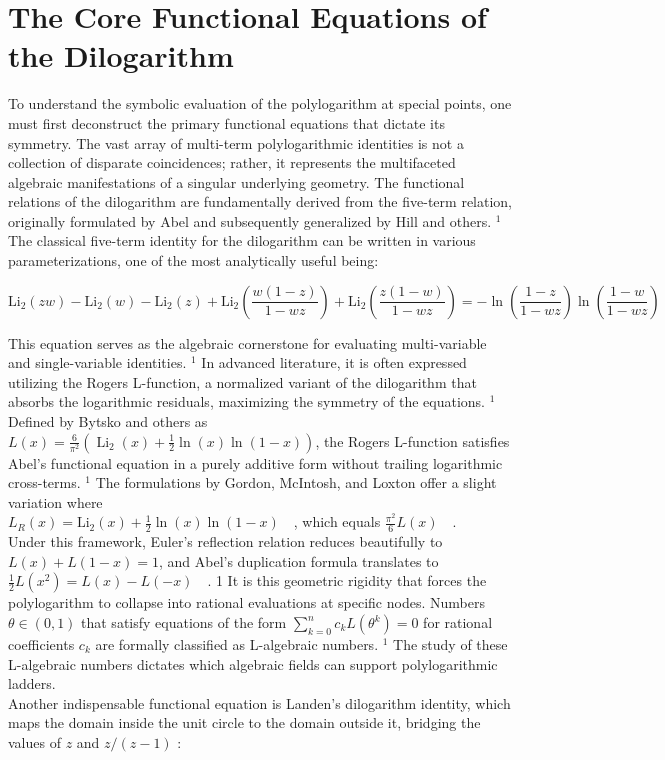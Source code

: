\documentclass[10pt]{article}
\begin{document}
\section*{The Core Functional Equations of the Dilogarithm}
To understand the symbolic evaluation of the polylogarithm at special points, one must first deconstruct the primary functional equations that dictate its symmetry. The vast array of multi-term polylogarithmic identities is not a collection of disparate coincidences; rather, it represents the multifaceted algebraic manifestations of a singular underlying geometry. The functional relations of the dilogarithm are fundamentally derived from the five-term relation, originally formulated by Abel and subsequently generalized by Hill and others. ${ }^{1}$ The classical five-term identity for the dilogarithm can be written in various parameterizations, one of the most analytically useful being:

$$
\mathrm{Li}_{2}(z w)-\mathrm{Li}_{2}(w)-\mathrm{Li}_{2}(z)+\mathrm{Li}_{2}\left(\frac{w(1-z)}{1-w z}\right)+\mathrm{Li}_{2}\left(\frac{z(1-w)}{1-w z}\right)=-\ln \left(\frac{1-z}{1-w z}\right) \ln \left(\frac{1-w}{1-w z}\right)
$$

This equation serves as the algebraic cornerstone for evaluating multi-variable and single-variable identities. ${ }^{1}$ In advanced literature, it is often expressed utilizing the Rogers L-function, a normalized variant of the dilogarithm that absorbs the logarithmic residuals, maximizing the symmetry of the equations. ${ }^{1}$ Defined by Bytsko and others as $L(x)=\frac{6}{\pi^{2}}\left(\operatorname{Li}_{2}(x)+\frac{1}{2} \ln (x) \ln (1-x)\right)$, the Rogers L-function satisfies Abel's functional equation in a purely additive form without trailing logarithmic cross-terms. ${ }^{1}$ The formulations by Gordon, McIntosh, and Loxton offer a slight variation where\\
$L_{R}(x)=\mathrm{Li}_{2}(x)+\frac{1}{2} \ln (x) \ln (1-x) \quad$, which equals $\frac{\pi^{2}}{6} L(x) \quad$.\\
Under this framework, Euler's reflection relation reduces beautifully to $L(x)+L(1-x)=1$, and Abel's duplication formula translates to $\frac{1}{2} L\left(x^{2}\right)=L(x)-L(-x) \quad$. 1 It is this geometric rigidity that forces the polylogarithm to collapse into rational evaluations at specific nodes. Numbers $\theta \in(0,1)$ that satisfy equations of the form $\sum_{k=0}^{n} c_{k} L\left(\theta^{k}\right)=0$ for rational coefficients $c_{k}$ are formally classified as L-algebraic numbers. ${ }^{1}$ The study of these L-algebraic numbers dictates which algebraic fields can support polylogarithmic ladders.\\
Another indispensable functional equation is Landen's dilogarithm identity, which maps the domain inside the unit circle to the domain outside it, bridging the values of $z$ and $z /(z-1)$ :
\end{document}

